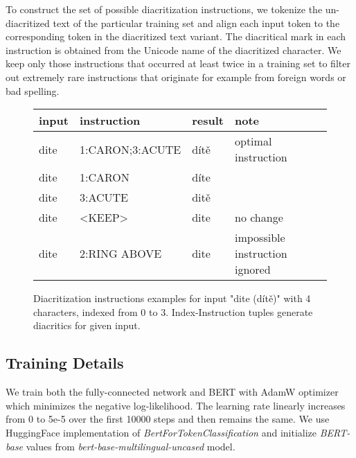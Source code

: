 \documentclass{pbmlarxiv}
\begin{document}
To construct the set of possible diacritization instructions, we tokenize the un-diacritized text of the particular training set and align each input token to the corresponding token in the diacritized text variant. The diacritical mark in each instruction is obtained from the Unicode name of the diacritized character. We keep only those instructions that occurred at least twice in a training set to filter out extremely rare instructions that originate for example from foreign words or bad spelling.







\begin{figure}
\centering
    \begin{tabular}{llll}
        input & instruction & result & note \\
        \midrule
        
         d{\color{b}i}t{\color{g}e} & {\color{b}1}:CARON;{\color{g}3}:ACUTE &       d{\color{b}í}t{\color{g}ě} & optimal instruction \\
         
         d{\color{b}i}te & {\color{b}1}:CARON & d{\color{b}í}te & \\
         dit{\color{g}e} & {\color{g}3}:ACUTE & dit{\color{g}ě} & \\
         dite & <KEEP> & dite & no change \\
         di{\color{red}t}e & {\color{red}2}:RING ABOVE & dite & impossible instruction ignored
    \end{tabular}
    \caption{Diacritization instructions examples for input "dite (dítě)" with 4 characters, indexed from 0 to 3. Index-Instruction tuples generate diacritics for given input.}
    \label{figure_instructions}
\end{figure}

\subsection{Training Details}
\label{ssec:training_details}

We train both the fully-connected network and BERT with AdamW optimizer which minimizes the negative log-likelihood. The learning rate linearly increases from 0 to 5e-5 over the first 10000 steps and then remains the same.  We use HuggingFace implementation of \textit{BertForTokenClassification} and initialize \textit{BERT-base} values from \textit{bert-base-multilingual-uncased} model.
\end{document}
